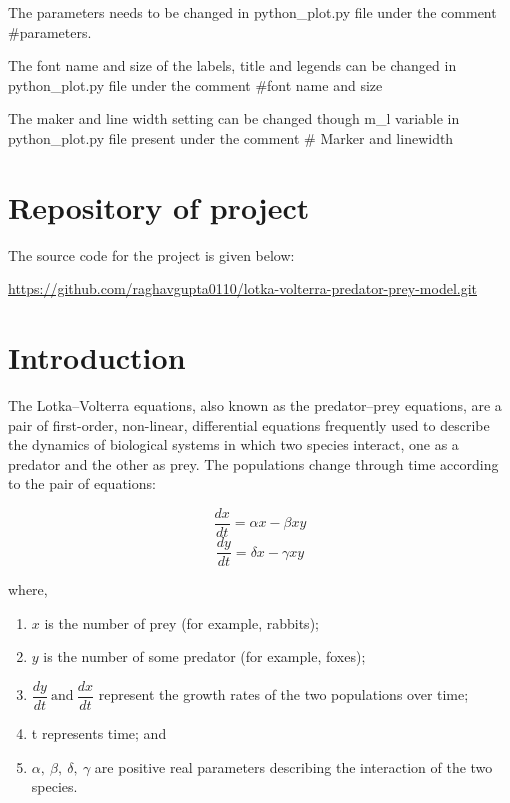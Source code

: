 \documentclass{article}
\begin{document}
The parameters needs to be changed in python\_plot.py file under the comment \#parameters.

The font name and size of the labels, title and legends can be changed in python\_plot.py file under the  comment \#font name and size 

The maker and line width setting can be changed though m\_l variable in python\_plot.py file present under the comment \# Marker and linewidth

\section{Repository of project}

The source code for the project is given below:

\noindent
\url{https://github.com/raghavgupta0110/lotka-volterra-predator-prey-model.git}

\section{Introduction}

The Lotka–Volterra equations, also known as the predator–prey equations, are a pair of first-order, non-linear, differential equations frequently used to describe the dynamics of biological systems in which two species interact, one as a predator and the other as prey. The populations change through time according to the pair of equations:

\begin{equation*}
\dfrac{dx}{dt} = \alpha x - \beta xy
\end{equation*}
\begin{equation*}
\dfrac{dy}{dt} = \delta x - \gamma xy
\end{equation*}

where,

\begin{enumerate}
\item $x$ is the number of prey (for example, rabbits);
\item $y$ is the number of some predator (for example, foxes);
\item $ \dfrac{dy}{dt} ~ \text{and} ~\dfrac{dx}{dt}$ represent the growth rates of the two populations over time;
\item t represents time; and
\item $\alpha , ~\beta , ~\delta , ~\gamma$ are positive real parameters describing the interaction of the two species.

\end{enumerate}
\end{document}
